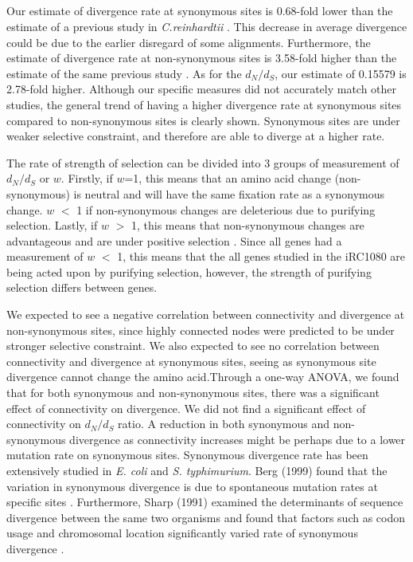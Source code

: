\documentclass[letterpaper, 10 pt, conference]{ieeeconf}  %
\begin{document}
\subsection*{}
Our estimate of divergence rate at synonymous sites is 0.68-fold lower than the estimate of a previous study in \textit{C.reinhardtii} \cite{pl07}. This decrease in average divergence could be due to the earlier disregard of some alignments. Furthermore, the estimate of divergence rate at non-synonymous sites is 3.58-fold higher than the estimate of the same previous study \cite{pl07}. As for the $d_N/d_S$, our estimate of 0.15579 is 2.78-fold higher. Although our specific measures did not accurately match other studies, the general trend of having a higher divergence rate at synonymous sites compared to non-synonymous sites is clearly shown. Synonymous sites are under weaker selective constraint, and therefore are able to diverge at a higher rate. 

The rate of strength of selection can be divided into 3 groups of measurement of $d_N/d_S$ or $w$. Firstly, if $w$=1, this means that an amino acid change (non-synonymous) is neutral and will have the same fixation rate as a synonymous change. $w$ $<$ 1 if non-synonymous changes are deleterious due to purifying selection. Lastly, if $w$ $>$ 1, this means that non-synonymous changes are advantageous and are under positive selection \cite{yb00}. Since all genes had a measurement of $w$ $<$ 1, this means that the all genes studied in the iRC1080 are being acted upon by purifying selection, however, the strength of purifying selection differs between genes. 


 

\setlength{\parindent}{10ex}
We expected to see a negative correlation between connectivity and divergence at non-synonymous sites, since highly connected nodes were predicted to be under stronger selective constraint. We also expected to see no correlation between connectivity and divergence at synonymous sites, seeing as synonymous site divergence cannot change the amino acid.Through a one-way ANOVA, we found that for both synonymous and non-synonymous sites, there was a significant effect of connectivity on divergence. We did not find a significant effect of connectivity on $d_N/d_S$ ratio. A reduction in both synonymous and non-synonymous divergence as connectivity increases might be perhaps due to a lower mutation rate on synonymous sites. Synonymous divergence rate has been extensively studied in \textit{E. coli} and \textit{S. typhimurium}. Berg (1999) found that the variation in synonymous divergence is due to spontaneous mutation rates at specific sites \cite{b99}. Furthermore, Sharp (1991) examined the determinants of sequence divergence between the same two organisms and found that factors such as codon usage and chromosomal location significantly varied rate of synonymous divergence \cite{s91}.  
\end{document}
